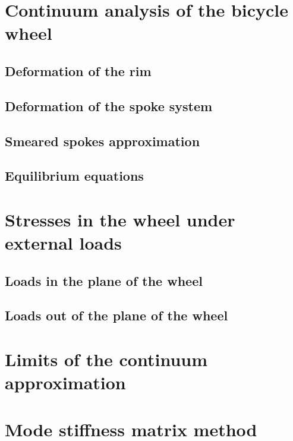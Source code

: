 \documentclass[../thesis.tex]{subfiles}
\begin{document}
\section{Continuum analysis of the bicycle wheel}

\subsection{Deformation of the rim}

\subsection{Deformation of the spoke system}

\subsection{Smeared spokes approximation}

\subsection{Equilibrium equations}


\section{Stresses in the wheel under external loads}

\subsection{Loads in the plane of the wheel}
\subsection{Loads out of the plane of the wheel}


\section{Limits of the continuum approximation}


\section{Mode stiffness matrix method}
\end{document}
